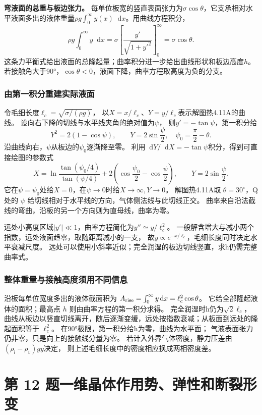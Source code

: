 \documentclass[UTF8,fontset=fandol,a4paper,11pt]{ctexart}
\newcommand{\dd}{\mathop{}\!\mathrm{d}}
\begin{document}
\textbf{弯液面的总重与板边张力。} 每单位板宽的竖直表面张力为$\sigma\cos\theta$，它支承相对水平液面多出的液体重量$\rho g\int_0^\infty y(x)\dd x$。用曲线方程积分，
\[
\rho g\int_0^\infty y\dd x
=\sigma\left[\frac{y'}{\sqrt{1+y'^2}}\right]_{0}^{\infty}
=\sigma\cos\theta.
\]
这条力平衡式给出液面的总隆起量；曲率积分进一步给出曲线形状和板边高度$h$。若接触角大于90°，$\cos\theta<0$，液面下降，曲率方程取高度为负的分支。
\subsubsection*{由第一积分重建实际液面}
令毛细长度$\ell_c=\sqrt{\sigma/(\rho g)}$，
以$X=x/\ell_c$、$Y=y/\ell_c$表示解图热4.11A的曲线。
设向右下降的切线与水平线夹角的绝对值为$\psi$，
则$y'=-\tan\psi$，第一积分给
\[
Y^2=2(1-\cos\psi),\qquad Y=2\sin\frac\psi2,
\quad\psi_0=\frac\pi2-\theta.
\]
沿曲线向右，$\psi$从板边的$\psi_0$逐渐降至零。
利用$\dd Y/\dd X=-\tan\psi$积分，得到可直接绘图的参数式
\[
X=\ln\frac{\tan(\psi_0/4)}{\tan(\psi/4)}
+2\left(\cos\frac{\psi_0}{2}-\cos\frac\psi2\right),
\qquad Y=2\sin\frac\psi2.
\]
它在$\psi=\psi_0$处给$X=0$，在$\psi\to0$时给$X\to\infty,Y\to0$。
解图热4.11A取 $\theta=30^\circ$，Q处的 $\psi$ 给切线相对于水平线的方向，气体侧法线与此切线正交。
曲率来自沿法截线的弯曲，沿板的另一个方向则为直母线，曲率为零。

远处小高度区域$|y'|\ll1$，曲率方程简化为$y''\simeq y/\ell_c^2$。
一般解含增大与减小两个指数，远处液面趋零，取随距离减小的一支，
故$y\propto e^{-x/\ell_c}$，毛细长度同时决定水平衰减尺度。
远处可以使用小斜率近似；完全润湿的板边切线竖直，求h仍需完整曲率式。

\subsubsection*{整体重量与接触高度须用不同信息}
沿板每单位宽度多出的液体截面积为
$A_{\rm rise}=\int_0^\infty y\dd x=\ell_c^2\cos\theta$。
它给全部隆起液体的面积；最高点 $h$ 则由曲率方程的第一积分求得。
完全润湿时h仍为$\sqrt2\ell_c$，
曲线从板边以竖直切线离开，随后逐渐变缓，远处按指数衰减；从板面到远处的隆起面积等于 $\ell_c^2$。
在90°极限，第一积分给h为零，曲线为水平面；
气液表面张力仍非零，只是向上的接触线分量为零。
若计入外界气体密度，静力压差由$(\rho_l-\rho_v)gy$决定，
则上述毛细长度中的密度相应换成两相密度差。




\section*{第 12 题\quad 一维晶体作用势、弹性和断裂形变}
\end{document}
